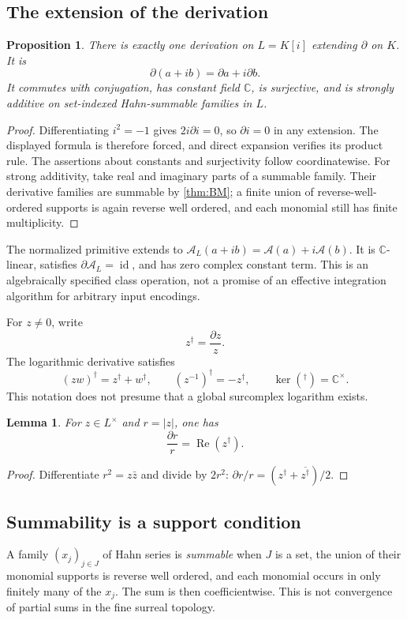 \documentclass[11pt]{article}
\numberwithin{equation}{section}
\newtheorem{proposition}[theorem]{Proposition}
\newtheorem{lemma}[theorem]{Lemma}
\theoremstyle{definition}
\newcommand{\C}{\mathbb C}
\newcommand{\DD}{\partial}
\newcommand{\Prim}{\mathcal A}
\newcommand{\re}{\operatorname{Re}}
\newcommand{\id}{\operatorname{id}}
\begin{document}
\subsection{The extension of the derivation}
\begin{proposition}\label{prop:complexextension}
There is exactly one derivation on $L=K[i]$ extending $\DD$ on $K$. It is
\[
 \DD(a+ib)=\DD a+i\DD b.
\]
It commutes with conjugation, has constant field $\C$, is surjective, and
is strongly additive on set-indexed Hahn-summable families in $L$.
\end{proposition}
\begin{proof}
Differentiating $i^2=-1$ gives $2i\DD i=0$, so $\DD i=0$ in any
extension. The displayed formula is therefore forced, and direct expansion
verifies its product rule. The assertions about constants and surjectivity
follow coordinatewise. For strong additivity, take real and imaginary
parts of a summable family. Their derivative families are summable by
\cref{thm:BM}; a finite union of reverse-well-ordered supports is again
reverse well ordered, and each monomial still has finite multiplicity.
\end{proof}

The normalized primitive extends to
$\Prim_L(a+ib)=\Prim(a)+i\Prim(b)$. It is $\C$-linear, satisfies
$\DD\Prim_L=\id$, and has zero complex constant term. This is an
algebraically specified class operation, not a promise of an effective
integration algorithm for arbitrary input encodings.

For $z\ne0$, write
\[
 z^\dagger=\frac{\DD z}{z}.
\]
The logarithmic derivative satisfies
\begin{equation}\label{eq:logderivative}
 (zw)^\dagger=z^\dagger+w^\dagger,\qquad
 (z^{-1})^\dagger=-z^\dagger,\qquad
 \ker({}^\dagger)=\C^\times.
\end{equation}
This notation does not presume that a global surcomplex logarithm exists.

\begin{lemma}\label{lem:radial}
For $z\in L^\times$ and $r=|z|$, one has
\[
 \frac{\DD r}{r}=\re(z^\dagger).
\]
\end{lemma}
\begin{proof}
Differentiate $r^2=z\bar z$ and divide by $2r^2$:
$\DD r/r=(z^\dagger+\overline{z^\dagger})/2$.
\end{proof}

\subsection{Summability is a support condition}
A family $(x_j)_{j\in J}$ of Hahn series is \emph{summable} when $J$ is a
set, the union of their monomial supports is reverse well ordered, and each
monomial occurs in only finitely many of the $x_j$. The sum is then
coefficientwise. This is not convergence of partial sums in the fine
surreal topology.
\end{document}
